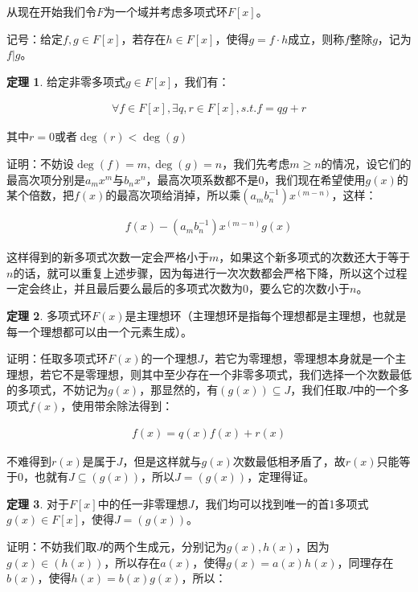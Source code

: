 \documentclass[12pt, a4paper, oneside]{ctexart}
\theoremstyle{definition}
\newtheorem*{theorem}{定理}
\begin{document}
从现在开始我们令$F$为一个域并考虑多项式环$F[x]$。

记号：给定$f,g\in F[x]$，若存在$h\in F[x]$，使得$g=f\cdot h$成立，则称$f$整除$g$，记为$f|g$。

\begin{theorem}
给定非零多项式$g\in F[x]$，我们有：

\begin{align*}
\forall f\in F[x],\exists q,r\in F[x],s.t.f=qg+r
\end{align*}

其中$r=0$或者$\deg(r)<\deg(g)$
\end{theorem}

证明：不妨设$\deg(f)=m,\deg(g)=n$，我们先考虑$m\geqslant n$的情况，设它们的最高次项分别是$a_mx^m$与$b_nx^n$，最高次项系数都不是0，我们现在希望使用$g(x)$的某个倍数，把$f(x)$的最高次项给消掉，所以乘$(a_mb_n^{-1})x^{(m-n)}$，这样：

\begin{align*}
f(x)-(a_mb_n^{-1})x^{(m-n)}g(x)
\end{align*}

这样得到的新多项式次数一定会严格小于$m$，如果这个新多项式的次数还大于等于$n$的话，就可以重复上述步骤，因为每进行一次次数都会严格下降，所以这个过程一定会终止，并且最后要么最后的多项式次数为0，要么它的次数小于$n$。

\begin{theorem}
多项式环$F(x)$是主理想环（主理想环是指每个理想都是主理想，也就是每一个理想都可以由一个元素生成）。
\end{theorem}

证明：任取多项式环$F(x)$的一个理想$J$，若它为零理想，零理想本身就是一个主理想，若它不是零理想，则其中至少存在一个非零多项式，我们选择一个次数最低的多项式，不妨记为$g(x)$，那显然的，有$(g(x))\subseteq J$，我们任取$J$中的一个多项式$f(x)$，使用带余除法得到：

\begin{align*}
f(x)=q(x)f(x)+r(x)
\end{align*}

不难得到$r(x)$是属于$J$，但是这样就与$g(x)$次数最低相矛盾了，故$r(x)$只能等于0，也就有$J\subseteq (g(x))$，所以$J=(g(x))$，定理得证。

\begin{theorem}
对于$F[x]$中的任一非零理想$J$，我们均可以找到唯一的首1多项式$g(x)\in F[x]$，使得$J=(g(x))$。
\end{theorem}

证明：不妨我们取$J$的两个生成元，分别记为$g(x),h(x)$，因为$g(x)\in (h(x))$，所以存在$a(x)$，使得$g(x)=a(x)h(x)$，同理存在$b(x)$，使得$h(x)=b(x)g(x)$，所以：
\end{document}
